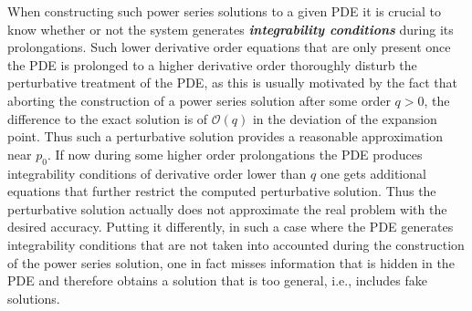 \documentclass[%
 reprint,
nofootinbib,
 amsmath,amssymb,
 aps,
 prd,
floatfix,
]{revtex4-2}
\begin{document}
When constructing such power series solutions to a given PDE it is crucial to know whether or not the system generates \textit{\textbf{integrability conditions}} during its prolongations. Such lower derivative order equations that are only present once the PDE is prolonged to a higher derivative order thoroughly disturb the perturbative treatment of the PDE, as this is usually motivated by the fact that aborting the construction of a power series solution
after some order $q>0$, the difference to the exact solution is of $\mathcal{O}(q)$ in the deviation of the expansion point. Thus such a perturbative solution provides a reasonable approximation near $p_0$. 
If now during some higher order prolongations the PDE produces integrability conditions of derivative order lower than $q$ one gets additional equations that further restrict the computed perturbative solution. 
Thus the perturbative solution actually does not approximate the real problem with the desired accuracy. Putting it differently, in such a case where the PDE generates integrability conditions that are not taken into accounted during the construction of the power series solution, one in fact misses information that is hidden in the PDE and therefore obtains a solution that is too general, i.e., includes fake solutions. 
\end{document}
